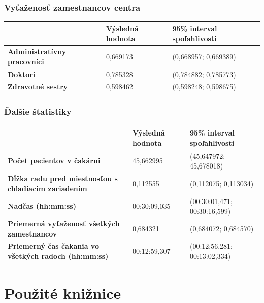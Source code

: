 \documentclass[letterpaper]{article}
\let\stdsection\section							%
\renewcommand\section{\newpage\stdsection}		%
\begin{document}
	\subsubsection*{Vyťaženosť zamestnancov centra}
	
	\begin{table}[hbt!]
		\begin{tabular}{p{6cm}|p{4.5cm}p{4.5cm}}
			& \textbf{Výsledná hodnota} & \textbf{95\% interval spoľahlivosti} \\
			\hline\hline
			\textbf{Administratívny pracovníci} 	& 0,669173            & (0,668957; 0,669389)			
			\\\hline
			\textbf{Doktori}  						& 0,785328            & (0,784882; 0,785773)	
			\\\hline
			\textbf{Zdravotné sestry}  				& 0,598462            & (0,598248; 0,598675)
		\end{tabular}
	\end{table}
	
	\subsubsection*{Ďalšie štatistiky}
	
	\begin{table}[hbt!]
		\begin{tabular}{p{6cm}|p{4.5cm}p{4.5cm}}
			& \textbf{Výsledná hodnota} & \textbf{95\% interval spoľahlivosti} \\
			\hline\hline
			\textbf{Počet pacientov v čakárni} 								& 45,662995           & (45,647972; 45,678018)			
			\\\hline
			\textbf{Dĺžka radu pred miestnosťou s chladiacim zariadením}	& 0,112555            & (0,112075; 0,113034)	
			\\\hline
			\textbf{Nadčas (hh:mm:ss)}										& 00:30:09,035        & (00:30:01,471; 00:30:16,599)
			\\\hline
			\textbf{Priemerná vyťaženosť všetkých zamestnancov}  			& 0,684321            & (0,684072; 0,684570)
			\\\hline
			\textbf{Priemerný čas čakania vo všetkých radoch (hh:mm:ss)}	& 00:12:59,307        & (00:12:56,281; 00:13:02,334)
		\end{tabular}
	\end{table}
	
	\section{Použité knižnice}
	
\end{document}
